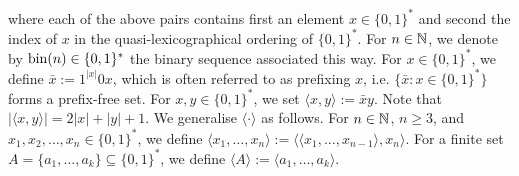 where each of the above pairs contains first an element $x \in \{0,1\}^\ast$ and second the index of $x$ in the quasi-lexicographical ordering of $\{0,1\}^\ast$. For $n \in \mathbb{N}$, we denote by $\operatorname{bin}(n) \in \{0,1\}^\ast$ the binary sequence associated this way. For $x \in \{0,1\}^\ast$, we define $\bar x := 1^{|x|}0x$, which is often referred to as prefixing $x$, i.e. $\{\bar x : x \in \{0,1\}^\ast\}$ forms a prefix-free set. For $x,y \in \{0,1\}^\ast$, we set $\langle x,y \rangle := \bar x y$. Note that $|\langle x,y \rangle| = 2 |x| + |y| + 1$. We generalise $\langle \cdot \rangle$ as follows. For $n \in \mathbb{N}$, $n \geq 3$, and $x_1, x_2, \ldots, x_n \in \{0,1\}^\ast$, we define $\langle x_1, \ldots, x_n \rangle := \langle \langle x_1, \ldots, x_{n-1} \rangle , x_n \rangle$. For a finite set $A = \{a_1, \ldots, a_k \} \subseteq \{0,1\}^\ast$, we define $\langle A \rangle := \langle a_1, \ldots, a_k \rangle$. 

